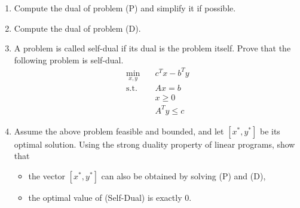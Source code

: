 \documentclass[11pt,a4paper]{article}
\begin{document}
\begin{enumerate}
    \item Compute the dual of problem (P) and simplify it if possible.
    \item Compute the dual of problem (D).
    \item A problem is called self-dual if its dual is the problem itself. Prove that the following problem is self-dual.
    \begin{equation} \tag{Self-Dual}
        \begin{aligned}
            \min_{x,y} \quad & c^{T}x - b^{T}y \\
            \text{s.t.} \quad & Ax = b \\
            & x \ge 0 \\
            & A^{T}y \le c
        \end{aligned}
    \end{equation}
    \item Assume the above problem feasible and bounded, and let $[x^{*},y^{*}]$ be its optimal solution. Using the strong duality property of linear programs, show that
    \begin{itemize}
        \item the vector $[x^{*},y^{*}]$ can also be obtained by solving (P) and (D),
        \item the optimal value of (Self-Dual) is exactly 0.
    \end{itemize}
\end{enumerate}
\end{document}
